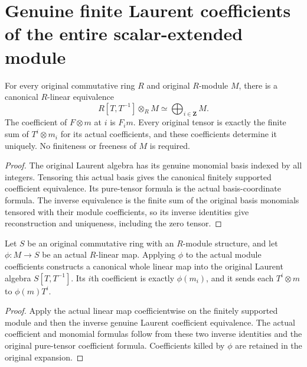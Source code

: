 \section{Genuine finite Laurent coefficients of the entire scalar-extended module}

\begin{theorem}\label{thm:laurent-module-actual-coefficients}
\leanok
For every original commutative ring $R$ and original $R$-module $M$,
there is a canonical $R$-linear equivalence
\[
 R[T,T^{-1}]\otimes_R M\simeq\bigoplus_{i\in\mathbf Z}M.
\]
The coefficient of $F\otimes m$ at $i$ is $F_i m$. Every original
tensor is exactly the finite sum of $T^i\otimes m_i$ for its actual
coefficients, and these coefficients determine it uniquely. No
finiteness or freeness of $M$ is required.
\end{theorem}
\begin{proof}
The original Laurent algebra has its genuine monomial basis indexed
by all integers. Tensoring this actual basis gives the canonical
finitely supported coefficient equivalence. Its pure-tensor formula
is the actual basis-coordinate formula. The inverse equivalence is
the finite sum of the original basis monomials tensored with their
module coefficients, so its inverse identities give reconstruction
and uniqueness, including the zero tensor.
\end{proof}

\begin{theorem}\label{thm:laurent-module-actual-evaluation}
\leanok
Let $S$ be an original commutative ring with an $R$-module structure,
and let $\phi:M\to S$ be an actual $R$-linear map. Applying $\phi$
to the actual module coefficients constructs a canonical whole
linear map into the original Laurent algebra $S[T,T^{-1}]$.
Its $i$th coefficient is exactly $\phi(m_i)$, and it sends each
$T^i\otimes m$ to $\phi(m)T^i$.
\end{theorem}
\begin{proof}
Apply the actual linear map coefficientwise on the finitely supported
module and then the inverse genuine Laurent coefficient equivalence.
The actual coefficient and monomial formulas follow from these two
inverse identities and the original pure-tensor coefficient formula.
Coefficients killed by $\phi$ are retained in the original expansion.
\end{proof}

